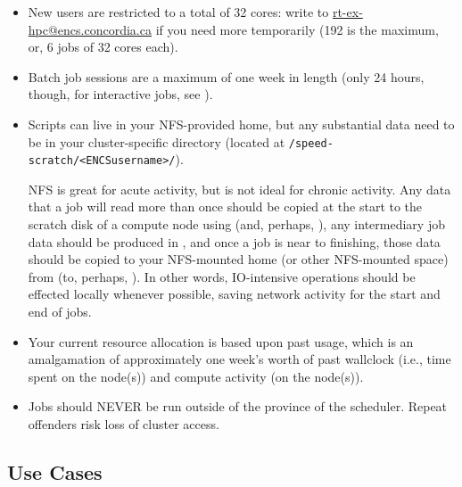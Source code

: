 \documentclass{easychair}
\begin{document}
\begin{itemize}
\item
New users are restricted to a total of 32 cores: write to \url{rt-ex-hpc@encs.concordia.ca}
if you need more temporarily (192 is the maximum, or, 6 jobs of 32 cores each).

\item
Batch job sessions are a maximum of one week in length (only 24 hours, though,
for interactive jobs, see ).

\item
Scripts can live in your NFS-provided home, but any substantial data need
to be in your cluster-specific directory
(located at \verb+/speed-scratch/<ENCSusername>/+).

NFS is great for acute activity, but is not ideal for chronic activity.
Any data that a job will 
read more than once should be copied at the start to the scratch disk of a 
compute node using  (and, perhaps, ), 
any intermediary job data should be produced in , and once a 
job is near to finishing, those data should be copied to your NFS-mounted 
home (or other NFS-mounted space) from  (to, perhaps,
). In other words, IO-intensive operations should be effected 
locally whenever possible, saving network activity for the start and end of 
jobs. 

\item
Your current resource allocation is based upon past usage, which is an 
amalgamation of approximately one week's worth of past wallclock (i.e., time 
spent on the node(s)) and compute activity (on the node(s)).

\item
Jobs should NEVER be run outside of the province of the scheduler.
Repeat offenders risk loss of cluster access. 

\end{itemize}



\subsection{Use Cases}
\label{sect:cases}
\end{document}
